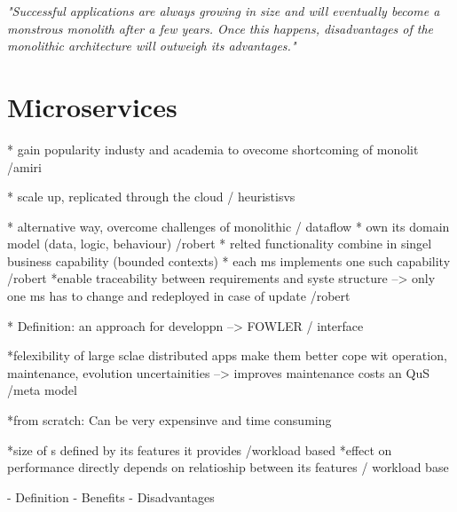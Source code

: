 \vspace*{\fill}

\centering

\textit{"Successful applications
	are always growing in size and will eventually become a
	monstrous monolith after a few years. Once this happens,
	disadvantages of the monolithic architecture will outweigh
	its advantages."} \cite{DataflowDrivenChen}


\vspace*{\fill}


\section{Microservices}
\label{sec:background:microservices}
* gain popularity industy and academia to ovecome shortcoming of monolit /amiri

* scale up, replicated through the cloud / heuristisvs

* alternative way, overcome challenges of monolithic / dataflow
* own its domain model (data, logic, behaviour) /robert
*  relted functionality combine in singel business capability (bounded contexts)
* each ms implements one such capability /robert
*enable traceability between requirements and syste structure --> only one ms has to change and redeployed in case of update /robert

* Definition: an approach for developpn --> FOWLER  / interface

*felexibility of large sclae distributed apps make them better cope wit operation, maintenance, evolution uncertainities --> improves maintenance costs an QuS /meta model

*from scratch: Can be very expensinve and time consuming

*size of s defined by its features it provides /workload based
*effect on performance directly depends on relatioship between its features / workload base

- Definition
- Benefits
- Disadvantages


